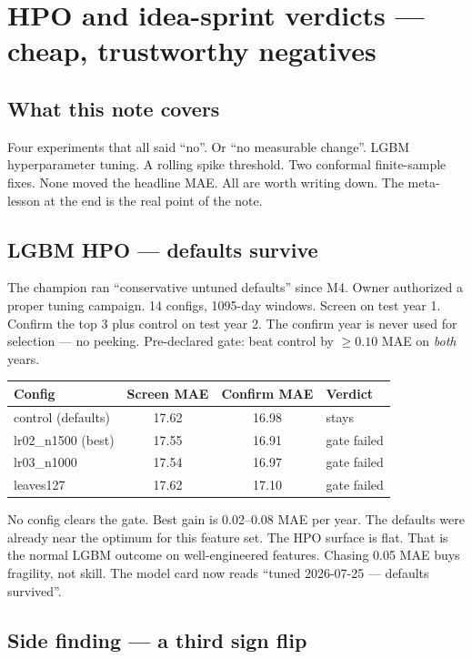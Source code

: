 \section{HPO and idea-sprint verdicts --- cheap, trustworthy negatives}

\subsection{What this note covers}

Four experiments that all said ``no''. Or ``no measurable change''.
LGBM hyperparameter tuning. A rolling spike threshold.
Two conformal finite-sample fixes.
None moved the headline MAE. All are worth writing down.
The meta-lesson at the end is the real point of the note.

\subsection{LGBM HPO --- defaults survive}

The champion ran ``conservative untuned defaults'' since M4.
Owner authorized a proper tuning campaign.
14 configs, 1095-day windows. Screen on test year 1.
Confirm the top 3 plus control on test year 2.
The confirm year is never used for selection --- no peeking.
Pre-declared gate: beat control by $\ge 0.10$ MAE on \emph{both} years.

\begin{tabular}{lccl}
\hline
Config & Screen MAE & Confirm MAE & Verdict \\
\hline
control (defaults) & 17.62 & 16.98 & stays \\
lr02\_n1500 (best) & 17.55 & 16.91 & gate failed \\
lr03\_n1000 & 17.54 & 16.97 & gate failed \\
leaves127 & 17.62 & 17.10 & gate failed \\
\hline
\end{tabular}

\vspace{0.5em}
No config clears the gate. Best gain is 0.02--0.08 MAE per year.
The defaults were already near the optimum for this feature set.
The HPO surface is flat. That is the normal LGBM outcome
on well-engineered features. Chasing 0.05 MAE buys fragility,
not skill. The model card now reads
``tuned 2026-07-25 --- defaults survived''.

\subsection{Side finding --- a third sign flip}

